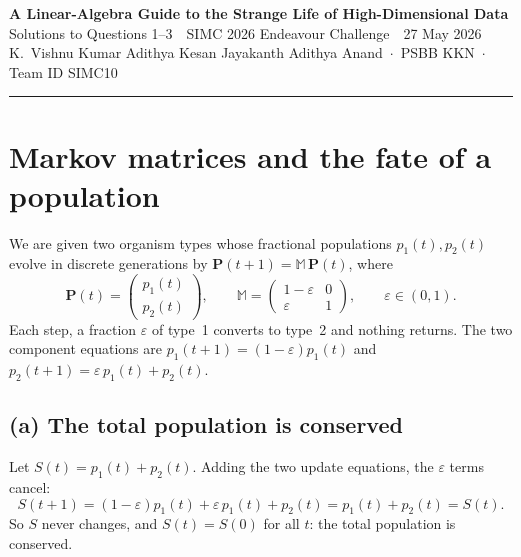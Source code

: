 \documentclass[12pt,a4paper]{article}
\theoremstyle{definition}
\newcommand{\M}{\mathbb{M}}
\begin{document}
\begin{center}
{\large\bfseries A Linear-Algebra Guide to the Strange Life of High-Dimensional Data}\\[2pt]
{\small Solutions to Questions 1--3 \,\textbullet\, SIMC 2026 Endeavour Challenge \,\textbullet\, 27 May 2026}\\[1pt]
{\small K.\ Vishnu Kumar \quad Adithya Kesan Jayakanth \quad Adithya Anand \,$\cdot$\, PSBB KKN \,$\cdot$\, Team ID SIMC10}
\end{center}
\vspace{-3pt}\noindent\rule{\linewidth}{0.4pt}

\section{Markov matrices and the fate of a population}

We are given two organism types whose fractional populations $p_1(t),p_2(t)$ evolve in discrete
generations by $\bm P(t{+}1)=\M\,\bm P(t)$, where
\begin{equation}
  \bm P(t)=\begin{pmatrix}p_1(t)\\ p_2(t)\end{pmatrix},\qquad
  \M=\begin{pmatrix}1-\varepsilon & 0\\[1pt] \varepsilon & 1\end{pmatrix},\qquad \varepsilon\in(0,1).
\end{equation}
Each step, a fraction $\varepsilon$ of type~1 converts to type~2 and nothing returns. The two
component equations are $p_1(t{+}1)=(1-\varepsilon)p_1(t)$ and $p_2(t{+}1)=\varepsilon\,p_1(t)+p_2(t)$.

\subsection{(a) The total population is conserved}
Let $S(t)=p_1(t)+p_2(t)$. Adding the two update equations, the $\varepsilon$ terms cancel:
\begin{equation}
  S(t{+}1)=(1-\varepsilon)p_1(t)+\varepsilon\,p_1(t)+p_2(t)=p_1(t)+p_2(t)=S(t).
\end{equation}
So $S$ never changes, and $S(t)=S(0)$ for all $t$: the total population is conserved.
\end{document}
